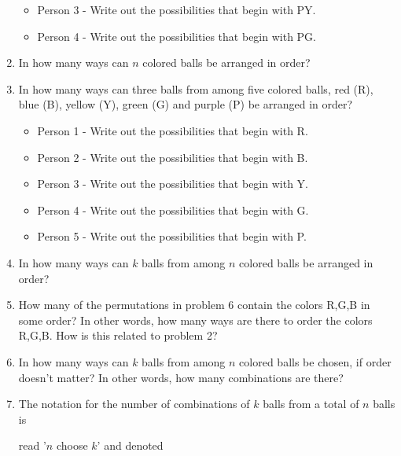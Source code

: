 \documentclass[number]{ximera}
\begin{document}
\begin{enumerate}
\begin{itemize}
\item Person 3 - Write out the possibilities that begin with PY.

\item Person 4 - Write out the possibilities that begin with PG.

\end{itemize}

\item In how many ways can $n$ colored balls be arranged in order?

\item In how many ways can three balls from among five colored balls, red (R), blue (B), yellow (Y), green (G) and purple (P) be arranged in order?

\begin{itemize}

\item Person 1 - Write out the possibilities that begin with R.

\item Person 2 - Write out the possibilities that begin with B.

\item Person 3 - Write out the possibilities that begin with Y.

\item Person 4 - Write out the possibilities that begin with G.

\item Person 5 - Write out the possibilities that begin with P.

\end{itemize}

\item In how many ways can $k$ balls from among $n$ colored balls be arranged in order?

\item How many of the permutations in problem 6 contain the colors R,G,B in some order? In other words, how many ways are there to order the colors R,G,B. How is this related to problem 2?

\item In how many ways can $k$ balls from among $n$ colored balls be chosen, if order doesn't matter? In other words, how many combinations are there?

\newpage

\item The notation for the number of combinations of $k$ balls from a total of $n$ balls is 

read '$n$ choose $k$' and denoted


\end{enumerate}
\end{document}
